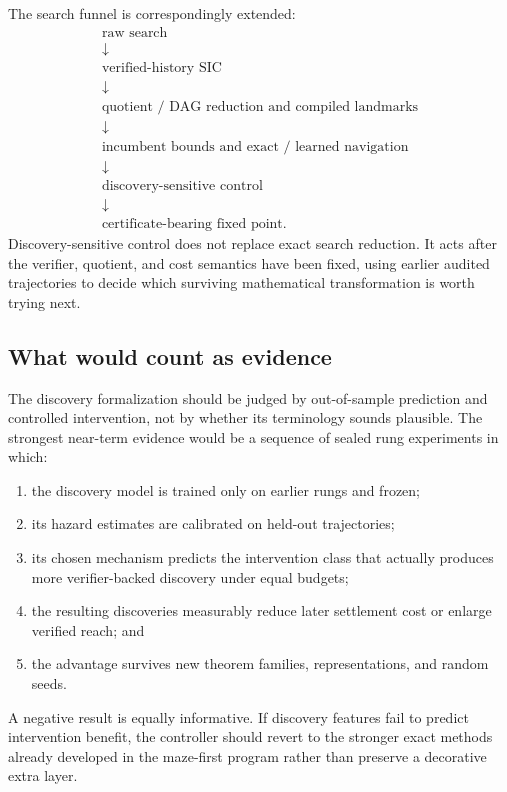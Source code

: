 The search funnel is correspondingly extended:
\[
\begin{array}{c}
\text{raw search}\\
\downarrow\\
\text{verified-history SIC}\\
\downarrow\\
\text{quotient / DAG reduction and compiled landmarks}\\
\downarrow\\
\text{incumbent bounds and exact / learned navigation}\\
\downarrow\\
\text{discovery-sensitive control}\\
\downarrow\\
\text{certificate-bearing fixed point.}
\end{array}
\]
Discovery-sensitive control does not replace exact search reduction. It acts after the verifier, quotient, and cost semantics have been fixed, using earlier audited trajectories to decide which surviving mathematical transformation is worth trying next.

\subsection{What would count as evidence}
The discovery formalization should be judged by out-of-sample prediction and controlled intervention, not by whether its terminology sounds plausible. The strongest near-term evidence would be a sequence of sealed rung experiments in which:
\begin{enumerate}
\item the discovery model is trained only on earlier rungs and frozen;
\item its hazard estimates are calibrated on held-out trajectories;
\item its chosen mechanism predicts the intervention class that actually produces more verifier-backed discovery under equal budgets;
\item the resulting discoveries measurably reduce later settlement cost or enlarge verified reach; and
\item the advantage survives new theorem families, representations, and random seeds.
\end{enumerate}
A negative result is equally informative. If discovery features fail to predict intervention benefit, the controller should revert to the stronger exact methods already developed in the maze-first program rather than preserve a decorative extra layer.
